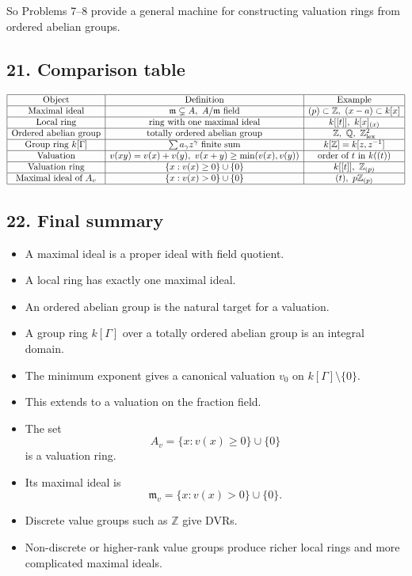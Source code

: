 \documentclass[12pt,a4paper]{article}
\theoremstyle{notespace}
\begin{document}
So Problems 7--8 provide a general machine for constructing valuation rings from ordered abelian groups.

\subsection{21. Comparison table}

\[
\begin{array}{|c|c|c|}
	\hline
	\text{Object} & \text{Definition} & \text{Example} \\
	\hline
	\text{Maximal ideal} & \mathfrak m\subsetneq A,\ A/\mathfrak m \text{ field} & (p)\subset \mathbb Z,\ (x-a)\subset k[x] \\
	\hline
	\text{Local ring} & \text{ring with one maximal ideal} & k[[t]],\ k[x]_{(x)} \\
	\hline
	\text{Ordered abelian group} & \text{totally ordered abelian group} & \mathbb Z,\ \mathbb Q,\ \mathbb Z^2_{\mathrm{lex}} \\
	\hline
	\text{Group ring } k[\Gamma] & \sum a_\gamma z^\gamma \text{ finite sum} & k[\mathbb Z]=k[z,z^{-1}] \\
	\hline
	\text{Valuation} & v(xy)=v(x)+v(y),\ v(x+y)\ge \min(v(x),v(y)) & \text{order of } t \text{ in } k((t)) \\
	\hline
	\text{Valuation ring} & \{x:v(x)\ge 0\}\cup\{0\} & k[[t]],\ \mathbb Z_{(p)} \\
	\hline
	\text{Maximal ideal of }A_v & \{x:v(x)>0\}\cup\{0\} & (t),\ p\mathbb Z_{(p)} \\
	\hline
\end{array}
\]

\subsection{22. Final summary}

\begin{itemize}
	\item A maximal ideal is a proper ideal with field quotient.
	\item A local ring has exactly one maximal ideal.
	\item An ordered abelian group is the natural target for a valuation.
	\item A group ring \(k[\Gamma]\) over a totally ordered abelian group is an integral domain.
	\item The minimum exponent gives a canonical valuation \(v_0\) on \(k[\Gamma]\setminus\{0\}\).
	\item This extends to a valuation on the fraction field.
	\item The set
	\[
	A_v=\{x:v(x)\ge 0\}\cup\{0\}
	\]
	is a valuation ring.
	\item Its maximal ideal is
	\[
	\mathfrak m_v=\{x:v(x)>0\}\cup\{0\}.
	\]
	\item Discrete value groups such as \(\mathbb Z\) give DVRs.
	\item Non-discrete or higher-rank value groups produce richer local rings and more complicated maximal ideals.
\end{itemize}
	
\end{document}
